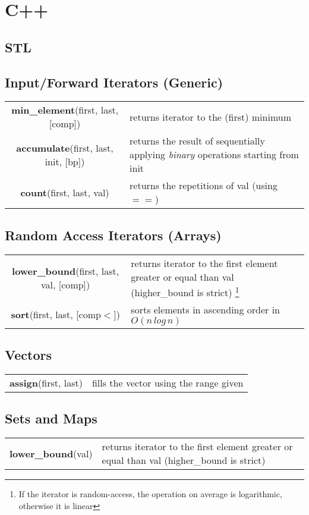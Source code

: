 \pagebreak

\section{C++}

\subsection{STL}

{\centering \subsection*{Input/Forward Iterators (Generic)}}
\begin{tabularx}{\textwidth/2-20pt}{c X}
    \textbf{min\_element}(first, last, [comp]) & returns iterator to the (first) minimum \\
    \textbf{accumulate}(first, last, init, [bp]) & returns the result of sequentially applying \textit{binary} operations starting from init \\
    \textbf{count}(first, last, val) & returns the repetitions of val (using $==$)
\end{tabularx}

{\centering \subsection*{Random Access Iterators (Arrays)}}
\begin{tabularx}{\textwidth/2-20pt}{c X}
    \textbf{lower\_bound}(first, last, val, [comp]) & returns iterator to the first element greater or equal than val (higher\_bound is strict) \footnote{If the iterator is random-access, the operation on average is logarithmic, otherwise it is linear} \\
    \textbf{sort}(first, last, [comp$<$]) & sorts elements in ascending order in $O(n \, log \, n)$
\end{tabularx}

{\centering \subsection*{Vectors}}
\begin{tabularx}{\textwidth/2-20pt}{c X}
    \textbf{assign}(first, last) & fills the vector using the range given \\
\end{tabularx}

{\centering \subsection*{Sets and Maps}}
\begin{tabularx}{\textwidth/2-20pt}{c X}
    \textbf{lower\_bound}(val) & returns iterator to the first element greater or equal than val (higher\_bound is strict)
\end{tabularx}

